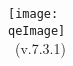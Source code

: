 \begin{center}
\def\version{7.3.1}
\def\qeImage{../../Doc/quantum_espresso}


  \texttt{[image: \\qeImage]} \\
  
	       \vspace{5.5cm}
  \Huge \intitle\ (v.\version) 
\end{center}
